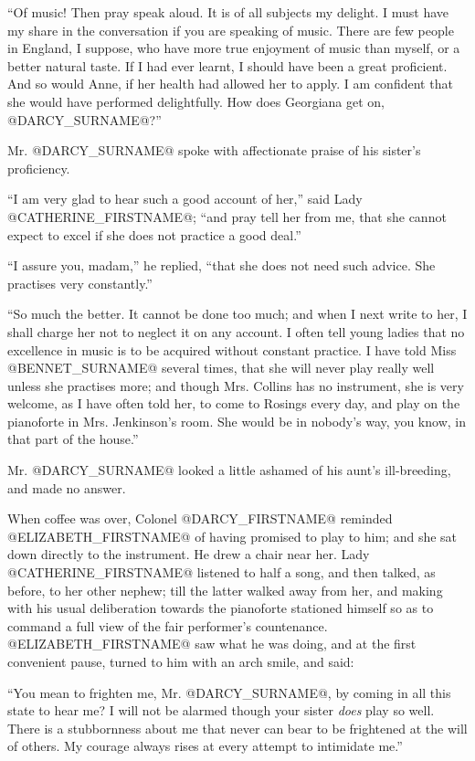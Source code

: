 ``Of music! Then pray speak aloud. It is of all subjects my delight. I
must have my share in the conversation if you are speaking of music.
There are few people in England, I suppose, who have more true enjoyment
of music than myself, or a better natural taste. If I had ever learnt,
I should have been a great proficient. And so would Anne, if her health
had allowed her to apply. I am confident that she would have performed
delightfully. How does Georgiana get on, @DARCY_SURNAME@?''

Mr. @DARCY_SURNAME@ spoke with affectionate praise of his sister's proficiency.

``I am very glad to hear such a good account of her,'' said Lady
@CATHERINE_FIRSTNAME@; ``and pray tell her from me, that she cannot expect to excel
if she does not practice a good deal.''

``I assure you, madam,'' he replied, ``that she does not need such advice.
She practises very constantly.''

``So much the better. It cannot be done too much; and when I next write
to her, I shall charge her not to neglect it on any account. I often
tell young ladies that no excellence in music is to be acquired without
constant practice. I have told Miss @BENNET_SURNAME@ several times, that she
will never play really well unless she practises more; and though Mrs.
Collins has no instrument, she is very welcome, as I have often told
her, to come to Rosings every day, and play on the pianoforte in Mrs.
Jenkinson's room. She would be in nobody's way, you know, in that part
of the house.''

Mr. @DARCY_SURNAME@ looked a little ashamed of his aunt's ill-breeding, and made
no answer.

When coffee was over, Colonel @DARCY_FIRSTNAME@ reminded @ELIZABETH_FIRSTNAME@ of having
promised to play to him; and she sat down directly to the instrument. He
drew a chair near her. Lady @CATHERINE_FIRSTNAME@ listened to half a song, and then
talked, as before, to her other nephew; till the latter walked away
from her, and making with his usual deliberation towards the pianoforte
stationed himself so as to command a full view of the fair performer's
countenance. @ELIZABETH_FIRSTNAME@ saw what he was doing, and at the first
convenient pause, turned to him with an arch smile, and said:

``You mean to frighten me, Mr. @DARCY_SURNAME@, by coming in all this state to hear
me? I will not be alarmed though your sister \textit{does} play so well. There
is a stubbornness about me that never can bear to be frightened at the
will of others. My courage always rises at every attempt to intimidate
me.''

